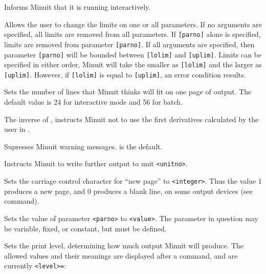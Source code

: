 
Informs Minuit that it is running interactively.


Allows the user to change the limits on one or all parameters.
If no arguments are specified, all limits are removed from all parameters.
If \texttt{[parno]} alone is specified, limits are removed from parameter 
\texttt{[parno]}.
If all arguments are specified, then parameter \texttt{[parno]} will be bounded
between \texttt{[lolim]} and \texttt{[uplim]}. 
Limits can be specified in either order,
Minuit will take the smaller as \texttt{[lolim]} and the larger as \texttt{[uplim]}.
However, if \texttt{[lolim]} is equal to \texttt{[uplim]}, an error condition results.


Sets the number of lines that Minuit thinks will fit on
one page of output.
The default value is 24 for interactive mode and 56 for batch.


The inverse of , instructs Minuit not to use the
first derivatives calculated by the user in .


Supresses Minuit warning messages.  is the default.


Instructs Minuit to write further output to unit \texttt{<unitno>}.


Sets the carriage control character for ``new page'' to \texttt{<integer>}.
Thus the value 1 produces a new page, and 0 produces a blank line,
on some output devices (see  command).


Sets the value of parameter \texttt{<parno>} to \texttt{<value>}.  
The parameter
in question may be variable, fixed, or constant, but must be defined.


Sets the print level, determining how much output
Minuit will produce.
The allowed values and their meanings are displayed
after a  command, and are currently \texttt{<level>=}:

